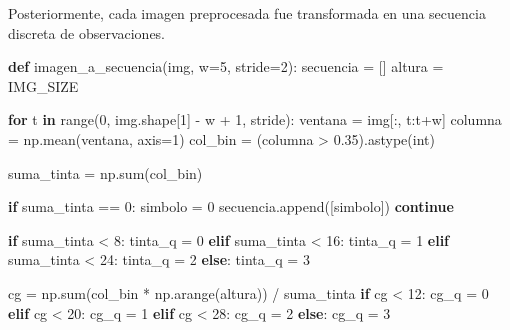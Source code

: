\documentclass[
  spanish,
  us-letterpaper,
  DIV=11,
  numbers=noendperiod]{scrreprt}
\newenvironment{Shaded}{\begin{snugshade}}{\end{snugshade}}
\newcommand{\BuiltInTok}[1]{\textcolor[rgb]{0.00,0.23,0.31}{#1}}
\newcommand{\ControlFlowTok}[1]{\textcolor[rgb]{0.00,0.23,0.31}{\textbf{#1}}}
\newcommand{\DecValTok}[1]{\textcolor[rgb]{0.68,0.00,0.00}{#1}}
\newcommand{\FloatTok}[1]{\textcolor[rgb]{0.68,0.00,0.00}{#1}}
\newcommand{\KeywordTok}[1]{\textcolor[rgb]{0.00,0.23,0.31}{\textbf{#1}}}
\newcommand{\NormalTok}[1]{\textcolor[rgb]{0.00,0.23,0.31}{#1}}
\newcommand{\OperatorTok}[1]{\textcolor[rgb]{0.37,0.37,0.37}{#1}}
\begin{document}
Posteriormente, cada imagen preprocesada fue transformada en una
secuencia discreta de observaciones.

\begin{Shaded}
\begin{Highlighting}[]
\KeywordTok{def}\NormalTok{ imagen\_a\_secuencia(img, w}\OperatorTok{=}\DecValTok{5}\NormalTok{, stride}\OperatorTok{=}\DecValTok{2}\NormalTok{):}
\NormalTok{    secuencia }\OperatorTok{=}\NormalTok{ []}
\NormalTok{    altura }\OperatorTok{=}\NormalTok{ IMG\_SIZE}

    \ControlFlowTok{for}\NormalTok{ t }\KeywordTok{in} \BuiltInTok{range}\NormalTok{(}\DecValTok{0}\NormalTok{, img.shape[}\DecValTok{1}\NormalTok{] }\OperatorTok{{-}}\NormalTok{ w }\OperatorTok{+} \DecValTok{1}\NormalTok{, stride):}
\NormalTok{        ventana }\OperatorTok{=}\NormalTok{ img[:, t:t}\OperatorTok{+}\NormalTok{w]}
\NormalTok{        columna }\OperatorTok{=}\NormalTok{ np.mean(ventana, axis}\OperatorTok{=}\DecValTok{1}\NormalTok{)}
\NormalTok{        col\_bin }\OperatorTok{=}\NormalTok{ (columna }\OperatorTok{\textgreater{}} \FloatTok{0.35}\NormalTok{).astype(}\BuiltInTok{int}\NormalTok{)}

\NormalTok{        suma\_tinta }\OperatorTok{=}\NormalTok{ np.}\BuiltInTok{sum}\NormalTok{(col\_bin)}

        \ControlFlowTok{if}\NormalTok{ suma\_tinta }\OperatorTok{==} \DecValTok{0}\NormalTok{:}
\NormalTok{            simbolo }\OperatorTok{=} \DecValTok{0} 
\NormalTok{            secuencia.append([simbolo])}
            \ControlFlowTok{continue}

        \ControlFlowTok{if}\NormalTok{ suma\_tinta }\OperatorTok{\textless{}} \DecValTok{8}\NormalTok{: tinta\_q }\OperatorTok{=} \DecValTok{0}
        \ControlFlowTok{elif}\NormalTok{ suma\_tinta }\OperatorTok{\textless{}} \DecValTok{16}\NormalTok{: tinta\_q }\OperatorTok{=} \DecValTok{1}
        \ControlFlowTok{elif}\NormalTok{ suma\_tinta }\OperatorTok{\textless{}} \DecValTok{24}\NormalTok{: tinta\_q }\OperatorTok{=} \DecValTok{2}
        \ControlFlowTok{else}\NormalTok{: tinta\_q }\OperatorTok{=} \DecValTok{3}

\NormalTok{        cg }\OperatorTok{=}\NormalTok{ np.}\BuiltInTok{sum}\NormalTok{(col\_bin }\OperatorTok{*}\NormalTok{ np.arange(altura)) }\OperatorTok{/}\NormalTok{ suma\_tinta}
        \ControlFlowTok{if}\NormalTok{ cg }\OperatorTok{\textless{}} \DecValTok{12}\NormalTok{: cg\_q }\OperatorTok{=} \DecValTok{0}
        \ControlFlowTok{elif}\NormalTok{ cg }\OperatorTok{\textless{}} \DecValTok{20}\NormalTok{: cg\_q }\OperatorTok{=} \DecValTok{1}
        \ControlFlowTok{elif}\NormalTok{ cg }\OperatorTok{\textless{}} \DecValTok{28}\NormalTok{: cg\_q }\OperatorTok{=} \DecValTok{2}
        \ControlFlowTok{else}\NormalTok{: cg\_q }\OperatorTok{=} \DecValTok{3}


\end{Highlighting}
\end{Shaded}
\end{document}

